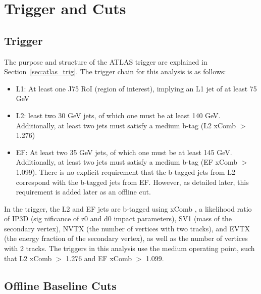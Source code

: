  

\chapter[Trigger and Cuts]{Trigger and Cuts}
 
\section{Trigger}
The purpose and structure of the ATLAS trigger are explained in Section~\ref{sec:atlas_trig}.  The trigger chain for this analysis is as follows: 

\begin{itemize}
    \item L1: At least one J75 RoI (region of interest), implying an L1 jet of at least 75 GeV
    \item L2: least two 30 GeV jets, of which one must be at least 140 GeV. Additionally, at least two
jets must satisfy a medium b-tag (L2 xComb $>$ 1.276)
    \item EF: At least two 35 GeV jets, of which one must be at least 145 GeV. Additionally, at least two
jets must satisfy a medium b-tag (EF xComb $>$ 1.099). There is no explicit requirement that the
b-tagged jets from L2 correspond with the b-tagged jets from EF. However, as detailed later, this
requirement is added later as an offline cut.
\end{itemize}


In the trigger, the L2 and EF jets are b-tagged using xComb \cite{}, a likelihood ratio of IP3D (sig
nificance of z0 and d0 impact parameters), SV1 (mass of the secondary vertex), NVTX (the number of
vertices with two tracks), and EVTX (the energy fraction of the secondary vertex), as well as the number
of vertices with 2 tracks. The triggers in this analysis use the medium operating point, such that L2 xComb
$>$ 1.276 and EF xComb $>$ 1.099.




\section{Offline Baseline Cuts}


